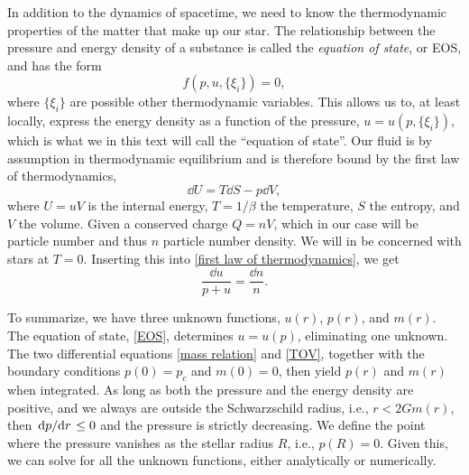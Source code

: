 In addition to the dynamics of spacetime, we need to know the thermodynamic properties of the matter that make up our star.
The relationship between the pressure and energy density of a substance is called the \emph{equation of state}, or EOS, and has the form
\begin{equation}
    \label{EOS}
    f(p, u, \{\xi_i\}) = 0,
\end{equation}
where $\{\xi_i\}$ are possible other thermodynamic variables.
This allows us to, at least locally, express the energy density as a function of the pressure, $u = u(p, \{\xi_i\})$, which is what we in this text will call the ``equation of state''.
Our fluid is by assumption in thermodynamic equilibrium and is therefore bound by the first law of thermodynamics,
%
\begin{equation}
    \label{first law of thermodynamics}
    \dd U = T \dd S - p \dd V,
\end{equation}
%
where $U = uV$ is the internal energy, $T=1/\beta$ the temperature, $S$ the entropy, and $V$ the volume.
Given a conserved charge $Q = n V$, which in our case will be particle number and thus $n$ particle number density.
We will in be concerned with stars at $T = 0$.
Inserting this into \autoref{first law of thermodynamics}, we get
%
\begin{equation}
    \label{firs law of thermodynamics fluid}
    \frac{\dd u}{p + u} = \frac{\dd n}{n}.
\end{equation}

To summarize, we have three unknown functions, $u(r)$, $p(r)$, and $m(r)$.
The equation of state, \autoref{EOS}, determines $u = u(p)$, eliminating one unknown.
The two differential equations \autoref{mass relation} and \autoref{TOV}, together with the boundary conditions $p(0) = p_c$ and $m(0) = 0$, then yield $p(r)$ and $m(r)$ when integrated.
As long as both the pressure and the energy density are positive, and we always are outside the Schwarzschild radius, i.e., $r<2 G m(r)$, then $\odv{p}/{r} \leq 0$ and the pressure is strictly decreasing.
We define the point where the pressure vanishes as the stellar radius $R$, i.e., $p(R) = 0$.
Given this, we can solve for all the unknown functions, either analytically or numerically.


